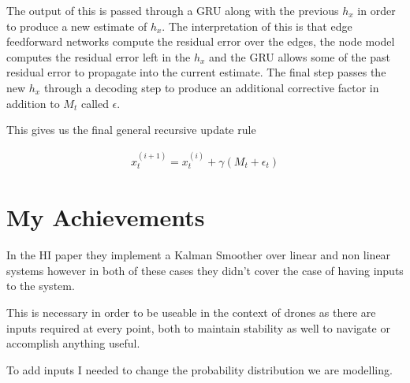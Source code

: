 \documentclass[]{../resources/final_report}
\begin{document}
The output of this is passed through a GRU along with the previous $h_x$ in order to produce a new 
estimate of $h_x$. The interpretation of this is that edge feedforward networks compute the residual 
error over the edges, the node model computes the residual error left in the $h_x$ and the GRU allows 
some of the past residual error to propagate into the current estimate. The final step passes the new 
$h_x$ through a decoding step to produce an additional corrective factor in addition to $M_t$ called $\epsilon$.

This gives us the final general recursive update rule

\begin{align}
  x_t^{(i+1)} = x_t^{(i)} + \gamma (M_t + \epsilon_t)
\end{align}


\section{My Achievements}


In the HI paper they implement a Kalman Smoother over linear and non linear systems however in both of these cases
they didn't cover the case of having inputs to the system.

This is necessary in order to be useable in the context of drones as there are inputs required at 
every point, both to maintain stability as well to navigate or accomplish anything useful.



To add inputs I needed to change the probability distribution we are modelling.
\end{document}

